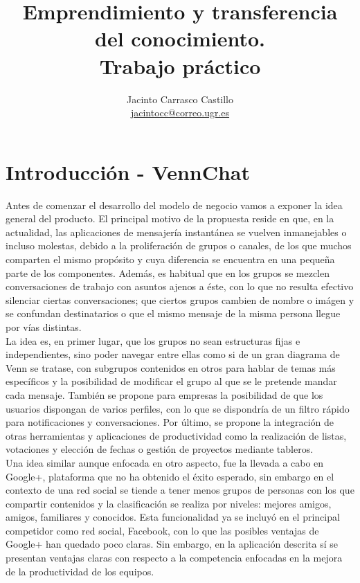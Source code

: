 \documentclass[11pt,leqno]{article}
\author{Jacinto Carrasco Castillo \\
		\href{jacintocc@correo.ugr.es}{jacintocc@correo.ugr.es}}
\title{Emprendimiento y transferencia del conocimiento.\\ Trabajo práctico}
\begin{document}
\maketitle
\tableofcontents

\newpage

\section*{Introducción - VennChat}
\label{sec:intro}

	Antes de comenzar el desarrollo del modelo de negocio vamos a exponer la
	idea general del producto. 
	El principal motivo de la propuesta reside en que, en la
	actualidad, las aplicaciones de mensajería instantánea
	se vuelven inmanejables o incluso molestas, 
	debido a la proliferación de grupos o canales, de los que muchos comparten
	el mismo propósito y cuya diferencia se encuentra en una pequeña 
	parte de los componentes. Además, es habitual que en los grupos se mezclen 
	conversaciones de trabajo con asuntos ajenos a éste, 
	con lo que no resulta efectivo silenciar ciertas conversaciones; 
	que ciertos grupos cambien de nombre o imágen y se confundan destinatarios
	o que el mismo mensaje
	de la misma persona llegue por vías distintas.\\
	La idea es, en primer lugar, 
	que los grupos no sean estructuras fijas e independientes,
	sino poder navegar entre ellas como si de un gran diagrama de Venn se
	tratase, 
	con subgrupos contenidos en otros para hablar de temas más específicos 
	y la posibilidad de modificar el grupo al que se le pretende
	mandar cada mensaje. 
	También se propone para empresas la posibilidad de que los usuarios 
	dispongan de varios perfiles, con lo que se dispondría de un filtro rápido
	para notificaciones y conversaciones. 
	Por último, se propone la integración de otras 
	herramientas y aplicaciones de productividad como la realización
	de listas, votaciones y elección de fechas o gestión de proyectos
	mediante tableros.\\
	Una idea similar aunque enfocada en otro aspecto, fue la llevada
	a cabo en Google+, plataforma que no ha obtenido el éxito esperado, sin
	embargo en el contexto de una red social se tiende a tener menos grupos
	de personas con los que compartir contenidos y la clasificación
	se realiza por niveles: mejores amigos, amigos, familiares y conocidos.
	Esta funcionalidad ya se incluyó en el principal competidor como
	red social, Facebook, con lo que las posibles ventajas de Google+ han
	quedado poco claras. Sin embargo, en la aplicación descrita
	sí se presentan ventajas claras con respecto a la competencia enfocadas
	en la mejora de la productividad de los equipos.
\end{document}
